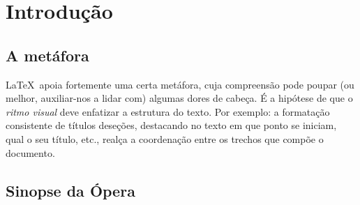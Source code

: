\section{Introdução}

\subsection{A metáfora}

\LaTeX\ apoia fortemente uma certa metáfora, cuja compreensão pode
poupar (ou melhor, auxiliar-nos a lidar com) algumas dores de cabeça.
É a hipótese de que o \emph{ritmo visual} deve enfatizar a estrutura
do texto. Por exemplo: a formatação consistente de títulos deseções,
destacando no texto em que ponto se iniciam, qual o seu título, etc.,
realça a coordenação entre os trechos que compõe o documento.

\subsection{Sinopse da Ópera}
